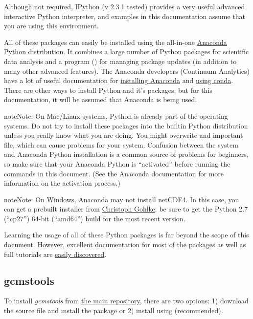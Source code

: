 \documentclass[letterpaper,10pt,english]{sphinxmanual}
\begin{document}
Although not required, IPython (v 2.3.1 tested) provides a very useful
advanced interactive Python interpreter, and examples in this documentation
assume that you are using this environment.

All of these packages can easily be installed using the all-in-one \href{http://continuum.io/downloads}{Anaconda
Python distribution}. It combines a large number of Python packages for
scientific data analysis and a program () for managing package
updates (in addition to many other advanced features). The Anaconda developers
(Continuum Analytics) have a lot of useful documentation for \href{http://docs.continuum.io/anaconda/}{installing
Anaconda} and \href{http://conda.pydata.org/docs/}{using conda}. There are other ways to install Python and it's
packages, but for this documentation, it will be assumed that Anaconda is
being used.

\begin{notice}{note}{Note:}
On Mac/Linux systems, Python is already part of the operating systems.  Do
not try to install these packages into the builtin Python distribution
unless you really know what you are doing. You might overwrite and
important file, which can cause problems for your system.  Confusion
between the system and Anaconda Python installation is a common source of
problems for beginners, so make sure that your Anaconda Python is
``activated'' before running the commands in this document. (See the
Anaconda documentation for more information on the activation process.)
\end{notice}

\begin{notice}{note}{Note:}
On Windows, Anaconda may not install netCDF4. In this case, you can get a
prebuilt installer from \href{http://www.lfd.uci.edu/~gohlke/pythonlibs/}{Christoph Gohlke}: be sure to get the Python 2.7
(``cp27'') 64-bit (``amd64'') build for the most recent version.
\end{notice}

Learning the usage of all of these Python packages is far beyond the scope of
this document. However, excellent documentation for most of the packages as
well as full tutorials are \href{https://google.com}{easily discovered}.


\subsection{gcmstools}
\label{intro:easily-discovered}\label{intro:gcmstools}
To install \emph{gcmstools} from \href{https://github.com/rnelsonchem/gcms\_nnls}{the main repository}, there are two options: 1)
download the source file and install the package or 2) install using 
(recommended).
\end{document}

